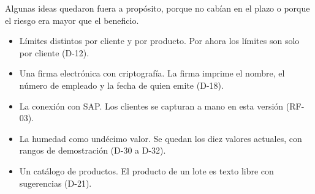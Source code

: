Algunas ideas quedaron fuera a propósito, porque no cabían en el plazo o porque el riesgo era mayor que el beneficio.

\begin{itemize}
  \item Límites distintos por cliente y por producto. Por ahora los límites son solo por cliente (D-12).
  \item Una firma electrónica con criptografía. La firma imprime el nombre, el número de empleado y la fecha de quien emite (D-18).
  \item La conexión con SAP. Los clientes se capturan a mano en esta versión (RF-03).
  \item La humedad como undécimo valor. Se quedan los diez valores actuales, con rangos de demostración (D-30 a D-32).
  \item Un catálogo de productos. El producto de un lote es texto libre con sugerencias (D-21).
\end{itemize}
